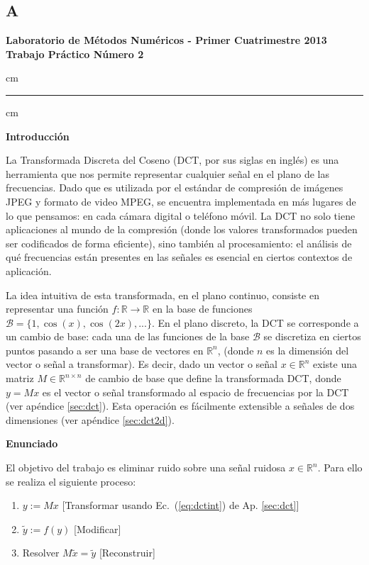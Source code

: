 \documentclass[10pt, a4paper]{article}
\newcommand{\real}{\mathbb{R}}
\begin{document}
\begin{itemize}
\subsection{A}
\begin{centering}
\large\bf Laboratorio de M\'etodos Num\'ericos - Primer Cuatrimestre 2013 \\
\large\bf Trabajo Pr\'actico N\'umero 2\\
\end{centering}

 cm
\hrule
{} cm 

{\bf Introducci\'on}

La Transformada Discreta del Coseno  (DCT, por sus siglas en ingl\'es) es una herramienta que nos permite representar cualquier se\~nal en el plano de las frecuencias. Dado que es utilizada por el est\'andar de compresi\'on de im\'agenes JPEG y formato de video MPEG, se encuentra implementada en m\'as lugares de lo que pensamos: en cada c\'amara digital o tel\'efono m\'ovil. 
La DCT no solo tiene aplicaciones al mundo de la compresi\'on (donde los valores transformados pueden ser codificados de forma eficiente), sino tambi\'en al procesamiento: el an\'alisis de qu\'e frecuencias est\'an presentes en las se\~nales es esencial en ciertos contextos de aplicaci\'on.

La idea intuitiva de esta transformada, en el plano continuo, consiste en representar una funci\'on $f: \mathbb{R} \rightarrow \mathbb{R}$ en la base de funciones $\mathcal{B}=\{1, \cos(x), \cos(2x),...\}$.
En el plano discreto, la DCT se corresponde a un cambio de base: cada una de las funciones de la base $\mathcal{B}$ se discretiza en ciertos puntos pasando a ser una base de vectores en $\mathbb{R}^n$, (donde $n$ es la dimensi\'on del vector o se\~nal a transformar).
Es decir, dado un vector o se\~nal $x\in\mathbb{R}^n$ existe una matriz $M\in\mathbb{R}^{n\times n}$ de cambio de base que define la transformada DCT, donde $y=Mx$ es el vector o se\~nal transformado al espacio de frecuencias por la DCT (ver ap\'endice \ref{sec:dct}). Esta operaci\'on es f\'acilmente extensible a se\~nales de dos dimensiones (ver ap\'endice \ref{sec:dct2d}).


{\bf Enunciado}

El objetivo del trabajo es eliminar ruido sobre una se\~nal ruidosa $x\in\real^{n}$. Para ello se realiza el siguiente proceso: 
\begin{enumerate}
\item  $y:=Mx$ [Transformar usando Ec.~(\ref{eq:dctint}) de Ap. \ref{sec:dct}]
\item $\tilde{y} := f(y)$ [Modificar]
\item Resolver $M \tilde{x} = \tilde{y}$ [Reconstruir]
\end{enumerate}


\end{itemize}
\end{document}
